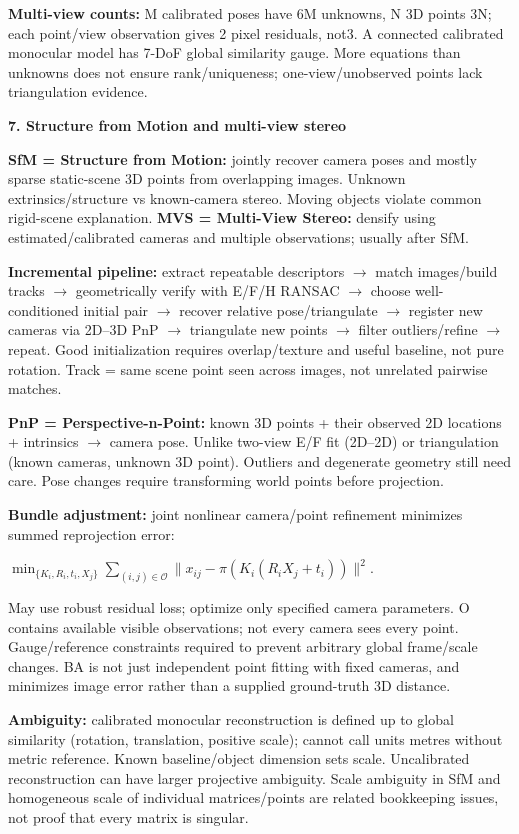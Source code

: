 \documentclass[a4paper]{article}
\newcommand{\key}[1]{\textbf{#1}}
\newcommand{\Topic}[1]{\par\vspace{1.7pt}\noindent
  {\fontsize{7.7}{8.0}\selectfont\bfseries #1}\par\vspace{0.3pt}}
\newcommand{\eq}[1]{\par\noindent\mbox{\(\displaystyle #1\)}\par}
\newcommand{\norm}[1]{\lVert #1\rVert}
\newcounter{sheet}
\newcounter{sheetcolumn}
\newlength{\colwidth}
\newenvironment{sheetcol}[1][7.0]{\stepcounter{sheetcolumn}
  \begin{lrbox}{\columnbox}\begin{minipage}[t]{\colwidth}\vspace{0pt}
  \fontsize{#1}{\dimexpr#1pt+0.6pt\relax}\selectfont}
  {\end{minipage}\end{lrbox}
  \typeout{CV1COL|\thesheet|\thesheetcolumn|\the\dimexpr\ht\columnbox+\dp\columnbox\relax}
  \usebox{\columnbox}\ignorespacesafterend}
\newcommand{\Sep}{\hfill}
\begin{document}
\begin{sheetcol}
\key{Multi-view counts:} M calibrated poses have 6M unknowns, N 3D points 3N; each point/view observation gives 2 pixel residuals, not3. A connected calibrated monocular model has 7-DoF global similarity gauge. More equations than unknowns does not ensure rank/uniqueness; one-view/unobserved points lack triangulation evidence.
\end{sheetcol}\Sep
\begin{sheetcol}
\Topic{7. Structure from Motion and multi-view stereo}
\key{SfM = Structure from Motion:} jointly recover camera poses and mostly sparse static-scene 3D points from overlapping images. Unknown extrinsics/structure vs known-camera stereo. Moving objects violate common rigid-scene explanation. \key{MVS = Multi-View Stereo:} densify using estimated/calibrated cameras and multiple observations; usually after SfM.

\key{Incremental pipeline:} extract repeatable descriptors \(\to\) match images/build tracks \(\to\) geometrically verify with E/F/H RANSAC \(\to\) choose well-conditioned initial pair \(\to\) recover relative pose/triangulate \(\to\) register new cameras via 2D--3D PnP \(\to\) triangulate new points \(\to\) filter outliers/refine \(\to\) repeat. Good initialization requires overlap/texture and useful baseline, not pure rotation. Track = same scene point seen across images, not unrelated pairwise matches.

\key{PnP = Perspective-n-Point:} known 3D points + their observed 2D locations + intrinsics \(\to\) camera pose. Unlike two-view E/F fit (2D--2D) or triangulation (known cameras, unknown 3D point). Outliers and degenerate geometry still need care. Pose changes require transforming world points before projection.

\key{Bundle adjustment:} joint nonlinear camera/point refinement minimizes summed reprojection error:
\eq{\min_{\{K_i,R_i,t_i,X_j\}}\sum_{(i,j)\in\mathcal O}
 \norm{x_{ij}-\pi(K_i(R_iX_j+t_i))}^2.}
May use robust residual loss; optimize only specified camera parameters. O contains available visible observations; not every camera sees every point. Gauge/reference constraints required to prevent arbitrary global frame/scale changes. BA is not just independent point fitting with fixed cameras, and minimizes image error rather than a supplied ground-truth 3D distance.

\key{Ambiguity:} calibrated monocular reconstruction is defined up to global similarity (rotation, translation, positive scale); cannot call units metres without metric reference. Known baseline/object dimension sets scale. Uncalibrated reconstruction can have larger projective ambiguity. Scale ambiguity in SfM and homogeneous scale of individual matrices/points are related bookkeeping issues, not proof that every matrix is singular.


\end{sheetcol}
\end{document}
